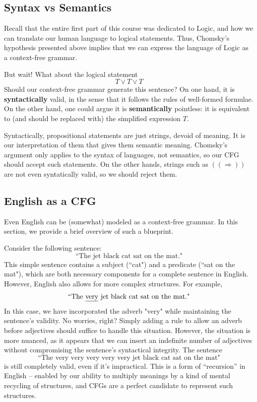 \documentclass{article}
\begin{document}
\subsection*{Syntax vs Semantics}
    Recall that the entire first part of this course was dedicated to Logic, and how we can translate our human language to logical statements. Thus, Chomsky's hypothesis presented above implies that we can express the language of Logic as a context-free grammar. 
    

    \vspace{2mm}
    But wait! What about the logical statement $$T \lor T \lor T$$ Should our context-free grammar generate this sentence? On one hand, it is \textbf{syntactically} valid, in the sense that it follows the rules of well-formed formulae. On the other hand, one could argue it is \textbf{semantically} pointless: it is equivalent to (and should be replaced with) the simplified expression $T$.

    \vspace{2mm}
    Syntactically, propositional statements are just strings, devoid of meaning. It is our interpretation of them that gives them semantic meaning. Chomsky's argument only applies to the syntax of languages, not semantics, so our CFG should accept such statements. On the other hands, strings such as $((\Rightarrow))$ are not even syntatically valid, so we should reject them.


\subsection*{English as a CFG}
    Even English can be (somewhat) modeled as a context-free grammar. In this section, we provide a brief overview of such a blueprint.
    
    \vspace{2mm}
    Consider the following sentence:$$\text{``The jet black cat sat on the mat."}$$ This simple sentence contains a subject (``cat") and a predicate (``sat on the mat"), which are both necessary components for a complete sentence in English. However, English also allows for more complex structures. For example, $$\text{``The \underline{very} jet black cat sat on the mat."}$$ In this case, we have incorporated the adverb "very" while maintaining the sentence's validity. No worries, right? Simply adding a rule to allow an adverb before adjectives should suffice to handle this situation. However, the situation is more nuanced, as it appears that we can insert an indefinite number of adjectives without compromising the sentence's syntactical integrity. The sentence $$\text{``The very very very very very jet black cat sat on the mat"}$$ is still completely valid, even if it's impractical. This is a form of “recursion” in English -- enabled by our ability to multiply meanings by a kind of mental recycling of structures, and CFGs are a perfect candidate to represent such structures.
\end{document}
